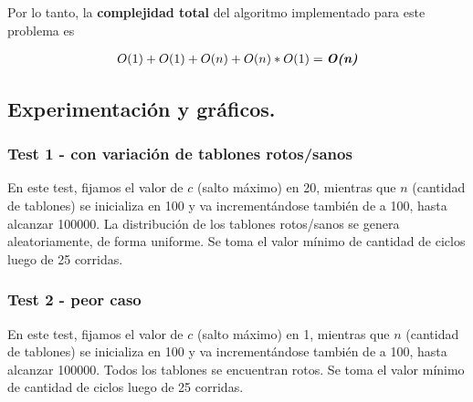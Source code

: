 Por lo tanto, la \textbf{complejidad total} del algoritmo implementado para este problema es

\begin{align*}
  O(1) + O(1) + O(n) + O(n)*O(1) = \textit{\textbf{O(n)}}
\end{align*}



\subsection{Experimentación y gráficos.}

\vspace*{0.3cm}

\subsubsection{Test 1 - con variación de tablones rotos/sanos}

En este test, fijamos el valor de $c$ (salto máximo) en 20, mientras que $n$ (cantidad de tablones) 
se inicializa en 100 y va incrementándose también de a 100, hasta alcanzar 100000. La 
distribución de los tablones rotos/sanos se genera aleatoriamente, de forma uniforme. 
Se toma el valor mínimo de cantidad de ciclos luego de 25 corridas. 


\vspace*{0.5cm}


\subsubsection{Test 2 - peor caso}

En este test, fijamos el valor de $c$ (salto máximo) en 1, mientras que $n$ (cantidad de tablones) 
se inicializa en 100 y va incrementándose también de a 100, hasta alcanzar 100000. Todos los 
tablones se encuentran rotos. 
Se toma el valor mínimo de cantidad de ciclos luego de 25 corridas.
